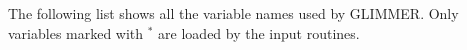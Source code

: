 \label{ug.sec.varlist}
The following list shows all the variable names used by GLIMMER. Only variables marked with $^\ast$ are loaded by the input routines.
%
%
%
